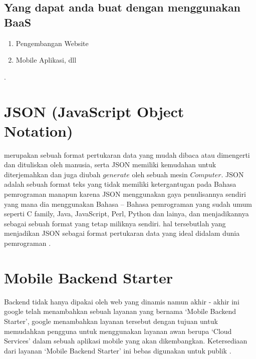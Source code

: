 \subsection {Yang dapat anda buat dengan menggunakan BaaS}
\begin{enumerate}
\item Pengembangan Website
\item Mobile Aplikasi, dll
\end{enumerate}
\cite{lane2015overview}.

\section{JSON (JavaScript Object Notation)}
	merupakan sebuah format pertukaran data yang mudah dibaca atau dimengerti dan dituliskan oleh manusia, 
serta JSON memiliki kemudahan untuk diterjemahkan dan juga diubah \(generate\) oleh sebuah mesin \(Computer\).
JSON adalah sebuah format teks yang tidak memiliki ketergantugan pada Bahasa pemrograman manapun karena JSON menggunakan 
gaya penulisannya sendiri yang mana dia menggunakan Bahasa – Bahasa pemrograman yang sudah umum seperti C family, Java, 
JavaScript, Perl, Python dan lainya, dan menjadikannya sebagai sebuah format yang tetap miliknya sendiri.
hal tersebutlah yang menjadikan JSON sebagai format pertukaran data yang ideal didalam dunia pemrograman
\cite{crockford2006application}.


\section{Mobile Backend Starter}
	Backend tidak hanya dipakai oleh web yang dinamis namun akhir - akhir ini google telah menambahkan sebuah layanan yang bernama
`Mobile Backend Starter', google menambahkan layanan tersebut dengan tujuan untuk memudahkan pengguna untuk menggunakan
layanan awan berupa `Cloud Services' dalam sebuah aplikasi mobile yang akan dikembangkan. Ketersediaan dari layanan `Mobile Backend Starter' ini bebas digunakan untuk publik
\cite{soinu2014cloud}.



		

